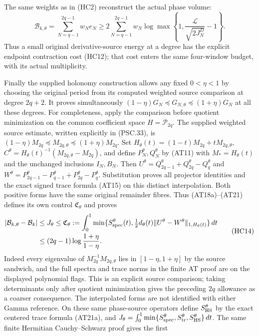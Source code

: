The same weights as in (HC2) reconstruct the actual phase volume:
\[
 \boxed{
 \mathcal B_{k,\theta}=\sum_{N=q-1}^{2q-1}w_N e_N
 \geq2\sum_{N=q-1}^{2q-1}w_N
 \log\max\left\{1,\frac{\mathcal L}{\sqrt{2J_N^D}}-1\right\}.}
 \tag{HC13}
\]
Thus a small original derivative-source energy at a degree has the
explicit endpoint contraction cost (HC12); that cost enters the same
four-window budget, with its actual multiplicity.

Finally the supplied holonomy construction allows any fixed
$0<\eta<1$ by choosing the original period from its computed weighted
source comparison at degree $2q+2$.  It proves simultaneously
$(1-\eta)G_N\preceq G_{N,\theta}\preceq(1+\eta)G_N$ at all these
degrees.  For completeness, apply the comparison before quotient
minimization on the common coefficient space $H=\mathcal P_{2q}$.
The supplied weighted source estimate, written explicitly in (PSC.33),
is $(1-\eta)M_{2q}\preceq M_{2q,\theta}\preceq(1+\eta)M_{2q}$.
Set $H_\theta(t)=(1-t)M_{2q}+tM_{2q,\theta}$,
$C^\theta=H_\theta(t)^{-1}(M_{2q,\theta}-M_{2q})$, and define
$P_N^\theta,Q_N^\theta$ by (AT11) with $M_*=H_\theta(t)$ and
the unchanged inclusions $I_N,B_N$. Then
$U^\theta=Q_{2q-1}^\theta+Q_{2q}^\theta-Q_q^\theta$ and
$W^\theta=P_{2q-1}^\theta-P_{q-1}^\theta+P_{2q}^\theta-P_q^\theta$.
Substitution proves all projector identities and the exact signed
trace formula (AT15) on this distinct interpolation. Both positive
forms have the same original remainder fibres. Thus (AT18a)--(AT21)
defines its own control $\mathfrak C_\theta$ and proves
\[
\begin{aligned}
 |\mathcal B_{k,\theta}-\mathcal B_k|
 &\le J_\theta\le\mathfrak C_\theta
 :=\int_0^1\min\{S_{\rm spec}^\theta(t),
        \tfrac12d_\theta(t)\|U^\theta-W^\theta\|_{1,H_\theta(t)}\}\,dt\\
 &\le(2q-1)\log\frac{1+\eta}{1-\eta}.
\end{aligned}\tag{HC14}
\]
Indeed every eigenvalue of $M_{2q}^{-1}M_{2q,\theta}$ lies in
$[1-\eta,1+\eta]$ by the source sandwich, and the full spectra
and trace norms in the finite AT proof are on the displayed
polynomial flags. This is an explicit source comparison; taking
determinants only after quotient minimization gives the preceding
$2q$ allowance as a coarser consequence. The interpolated forms
are not identified with either Gamma reference.
On these same phase-source operators define
$S_{\rm HS}^\theta$ by the exact centered trace formula (AT21a),
and $J_\theta=\int_0^1\min\{S_{\rm spec}^\theta,
S_{\rm tr}^\theta,S_{\rm HS}^\theta\}\,dt$.
The same finite Hermitian Cauchy--Schwarz proof gives the first
